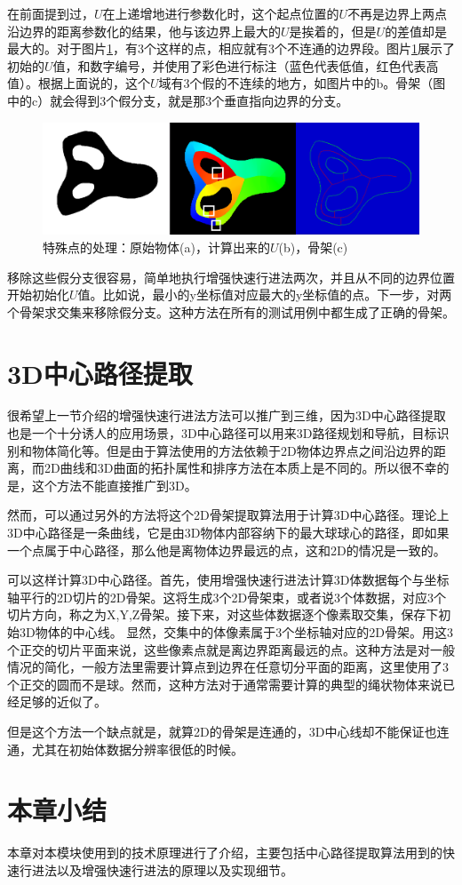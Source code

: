 在前面提到过，$U$在上递增地进行参数化时，这个起点位置的$U$不再是边界上两点沿边界的距离参数化的结果，他与该边界上最大的$U$是挨着的，但是$U$的差值却是最大的。对于图片\ref{special_points}，有3个这样的点，相应就有3个不连通的边界段。图片\ref{special_points}展示了初始的$U$值，和数字编号，并使用了彩色进行标注（蓝色代表低值，红色代表高值）。根据上面说的，这个$U$域有3个假的不连续的地方，如图片中的b。骨架（图中的c）就会得到3个假分支，就是那3个垂直指向边界的分支。
\begin{figure}[h!]
    \centering
    \includegraphics[width=400bp]{figure/special_points.png}
    \caption{特殊点的处理：原始物体(a)，计算出来的$U$(b)，骨架(c)}
    \label{special_points}
\end{figure}

移除这些假分支很容易，简单地执行增强快速行进法两次，并且从不同的边界位置开始初始化$U$值。比如说，最小的y坐标值对应最大的y坐标值的点。下一步，对两个骨架求交集来移除假分支。这种方法在所有的测试用例中都生成了正确的骨架。

\section{3D中心路径提取}
\label{afmm-3D}
很希望上一节介绍的增强快速行进法方法可以推广到三维，因为3D中心路径提取也是一个十分诱人的应用场景，3D中心路径可以用来3D路径规划和导航，目标识别和物体简化等。但是由于算法使用的方法依赖于2D物体边界点之间沿边界的距离，而2D曲线和3D曲面的拓扑属性和排序方法在本质上是不同的。所以很不幸的是，这个方法不能直接推广到3D。

然而，可以通过另外的方法将这个2D骨架提取算法用于计算3D中心路径。理论上3D中心路径是一条曲线，它是由3D物体内部容纳下的最大球球心的路径，即如果一个点属于中心路径，那么他是离物体边界最远的点，这和2D的情况是一致的。

可以这样计算3D中心路径。首先，使用增强快速行进法计算3D体数据每个与坐标轴平行的2D切片的2D骨架。这将生成3个2D骨架束，或者说3个体数据，对应3个切片方向，称之为X,Y,Z骨架。接下来，对这些体数据逐个像素取交集，保存下初始3D物体的中心线。
显然，交集中的体像素属于3个坐标轴对应的2D骨架。用这3个正交的切片平面来说，这些像素点就是离边界距离最远的点。这种方法是对一般情况的简化，一般方法里需要计算点到边界在任意切分平面的距离，这里使用了3个正交的圆而不是球。然而，这种方法对于通常需要计算的典型的绳状物体来说已经足够的近似了。

但是这个方法一个缺点就是，就算2D的骨架是连通的，3D中心线却不能保证也连通，尤其在初始体数据分辨率很低的时候。

\section{本章小结}
本章对本模块使用到的技术原理进行了介绍，主要包括中心路径提取算法用到的快速行进法以及增强快速行进法的原理以及实现细节。
